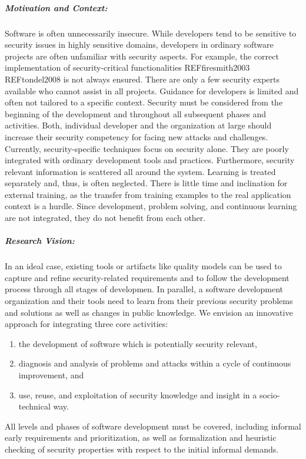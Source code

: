 
\subparagraph*{Motivation and Context:}
Software is often unnecessarily insecure. While developers tend to be sensitive to security issues in highly sensitive domains, developers in ordinary software projects are often unfamiliar with security aspects. For example, the correct implementation of security-critical functionalities REFfiresmith2003 REFtondel2008 is not always ensured. There are only a few security experts available who cannot assist in all projects. Guidance for developers is limited and often not tailored to a specific context. Security must be considered from the beginning of the development and throughout all subsequent phases and activities. Both, individual developer and the organization at large should increase their security competency for facing new attacks and challenges. Currently, security-specific techniques focus on security alone. They are poorly integrated with ordinary development tools and practices. Furthermore, security relevant information is scattered all around the system. Learning is treated separately and, thus, is often neglected. There is little time and inclination for external training, as the transfer from training examples to the real application context is a hurdle. Since development, problem solving, and continuous learning are not integrated, they do not benefit from each other.  

\subparagraph*{Research Vision:}
In an ideal case, existing tools or artifacts like quality models can be used to capture and refine security-related requirements and to follow the development process through all stages of develop­men. In parallel, a software development organization and their tools need to learn from their previous security problems and solutions as well as changes in public knowledge. We envision an innovative approach for integrating three core activities:

\begin{enumerate}
    \item the development of software which is potentially security relevant, 
    \item diagnosis and analysis of problems and attacks within a cycle of continuous improvement, and 
    \item use, reuse, and exploitation of security knowledge and insight in a socio-technical way.
\end{enumerate}

All levels and phases of software development must be covered, including informal early requirements and prioritization, as well as formalization and heuristic checking of security properties with respect to the initial informal demands. 

